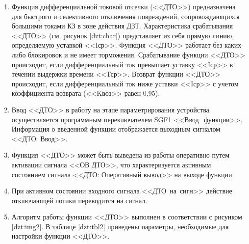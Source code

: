 \documentclass[a4paper, 12pt,table, hidelinks, DIV=calc]{extarticle} %
\begin{document}
\begin{enumerate}[label=\arabic{section}.\arabic{subsection}.\arabic{enumi}, labelsep=4pt, leftmargin=0pt, itemindent=57pt, itemsep=0pt, parsep=5pt]
\begin{enumerate}[label=\arabic{section}.\arabic{subsection}.\arabic{enumi}.\arabic*, labelsep=4pt, leftmargin=0em, itemindent=65pt, parsep=0pt]
\item
Функция дифференциальной токовой отсечки (<<ДТО>>) предназначена для быстрого и селективного отключения повреждений, сопровождающихся большими токами КЗ в зоне действия ДЗТ. Характеристика срабатывания <<ДТО>> (см. рисунок \ref{dzt:char}) представляет из себя прямую линию, определяемую уставкой <<Iср>>. Функция <<ДТО>> работает без каких-либо блокировок и не имеет торможения. Срабатывание функции <<ДТО>> происходит, если дифференциальный ток превышает уставку <<Iср>> в течении выдержки времени <<Тср>>. Возврат функции <<ДТО>> происходит, если дифференциальный ток ниже уставки <<Iср>> с учетом коэффициента возврата (<<Kвоз>> равен 0,95).

\item
Ввод <<ДТО>> в работу на этапе параметрирования устройства осуществляется программным переключателем SGF1 <<Ввод\_функции>>. Информация о введенной функции отображается выходным сигналом <<ДТО: Ввод>>.
\item
Функция <<ДТО>> может быть выведена из работы оперативно путем активации сигнала <<ОВ ДТО>>, что характеризуется активным состоянием сигнала <<ДТО: Оперативный вывод>> на выходе функции. 
\item
При активном состоянии входного сигнала <<ДТО~на~сигн>> действие отключающей логики переводится на сигнал.
\item
Алгоритм работы функции <<ДТО>> выполнен в соответствии с рисунком \ref{dzt:img2}. В таблице \ref{dzt:tbl2} приведены параметры, необходимые для настройки функции <<ДТО>>.


\end{enumerate}
\end{enumerate}
\end{document}
